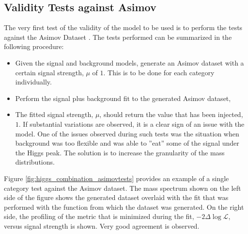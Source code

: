 \subsection{Validity Tests against Asimov}
The very first test of the validity of the model to be used is to perform the
tests against the Asimov Dataset \cite{Asymptotic}. The tests performed can be summarized in the following procedure:
\begin{itemize}
    \item Given the signal and background models, generate an Asimov dataset with a certain signal strength, $\mu$ of $1$. This is to be done for each category individually.
    \item Perform the signal plus background fit to the generated Asimov dataset,
    \item The fitted signal strength, $\mu$, should return the value that has been injected, $1$. If substantial variations are observed, it is a clear sign of an issue with the model. One of the issues observed during such tests was the situation when background was too flexible and was able to ''eat'' some of the signal under the Higgs peak. The solution is to increase the granularity of the mass distributions.
\end{itemize}
Figure \ref{fig:higgs_combination_asimovtests} provides an example of a single category test against the Asimov dataset. The mass spectrum shown on the left side of the figure shows the generated dataset overlaid with the fit that was performed with the function from which the dataset was generated. On the right side, the profiling of the metric that is minimized during the fit, $-2\Delta\log{\mathcal{L}}$, versus signal strength is shown. Very good agreement is observed.
